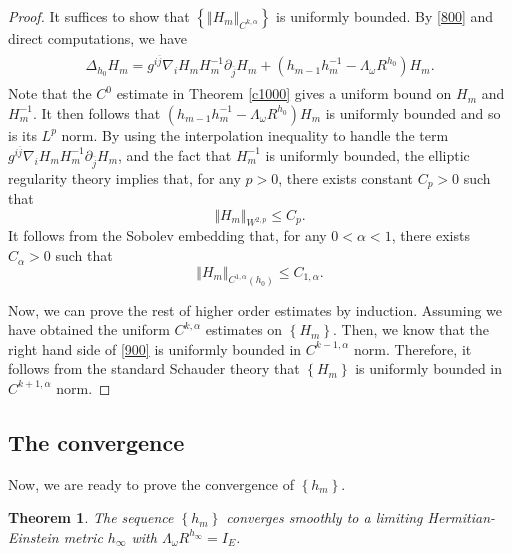 \documentclass[11pt]{amsart}
\newtheorem{theorem}{Theorem}[section]
\numberwithin{equation}{section}
\theoremstyle{remark}
\renewcommand{\bar}{\overline}
\newcommand{\pa}{\partial}
\newcommand{\he}{Hermitian-Einstein }
\newcommand{\lb}{\left (}
\newcommand{\rb}{\right )}
\newcommand{\lfb}{\left \{}
\newcommand{\rfb}{\right \}}
\newcommand{\ga}{\alpha}
\begin{document}
\begin{proof}

It suffices to show that $\lfb \Vert H_m\Vert_{C^{k,\ga}}\rfb$ is uniformly bounded.
By \eqref{800} and direct computations, we have
\begin{align}\label{900}
\begin{split}
\Delta_{h_0} H_m=g^{i\bar j}\nabla_i H_m H_m^{-1}\pa_{\bar j} H_m+\lb h_{m-1}h_m^{-1}-\Lambda_\omega R^{h_0}\rb H_m.
\end{split}
\end{align}
Note that the $C^0$ estimate in Theorem \ref{c1000} gives a uniform bound on $H_m$ and $H_m^{-1}$. It then follows that $\lb h_{m-1}h_m^{-1}-\Lambda_\omega R^{h_0}\rb H_m$ is uniformly bounded and so is its $L^p$ norm. By using the interpolation inequality to handle the term $g^{i\bar j}\nabla_i H_m H_m^{-1}\pa_{\bar j} H_m$, and the fact that $H_m^{-1}$ is uniformly bounded, the elliptic regularity theory implies that, for any $p>0$, there exists constant $C_p>0$ such that
\[
\Vert H_m\Vert_{W^{2,p}}\leq C_p.
\]
It follows from the Sobolev embedding that, for any $0<\alpha<1$,  there exists  $C_{\alpha}>0$ such that
\[\Vert H_m\Vert_{C^{1,\ga}\lb h_0\rb}\leq C_{1,\ga}.\]

Now, we can prove the rest of higher order estimates by induction. Assuming we have obtained the uniform $C^{k,\ga}$ estimates on $\lfb H_m\rfb$. Then, we know that the right hand side of \eqref{900} is uniformly bounded in $C^{k-1,\ga}$ norm. Therefore, it follows from the standard Schauder theory that $\lfb H_m\rfb$ is uniformly bounded in $C^{k+1,\ga}$ norm.


\end{proof}


\subsection{The convergence} Now, we are ready to prove the convergence of $\lfb h_m\rfb$.

\begin{theorem}\label{c3000}
The sequence $\lfb h_m\rfb$ converges smoothly to a limiting \he metric $h_\infty$ with $\Lambda_\omega R^{h_\infty}=I_E$.
\end{theorem}
\end{document}

